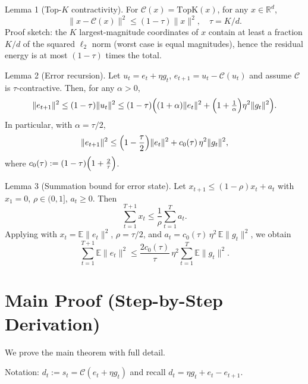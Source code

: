 \documentclass[11pt]{article}
\newcommand{\E}{\mathbb{E}}
\newcommand{\R}{\mathbb{R}}
\begin{document}
\noindent
Lemma 1 (Top-$K$ contractivity).
For $\mathcal{C}(x) = \mathrm{TopK}(x)$, for any $x \in \R^d$,
\[
\|x - \mathcal{C}(x)\|^2 \le (1-\tau)\|x\|^2,\quad \tau = K/d.
\]
Proof sketch: the $K$ largest-magnitude coordinates of $x$ contain at least a fraction $K/d$ of the squared $\ell_2$ norm (worst case is equal magnitudes), hence the residual energy is at most $(1-\tau)$ times the total.

\noindent
Lemma 2 (Error recursion).
Let $u_t = e_t + \eta g_t$, $e_{t+1} = u_t - \mathcal{C}(u_t)$ and assume $\mathcal{C}$ is $\tau$-contractive. Then, for any $\alpha>0$,
\[
\|e_{t+1}\|^2 \le (1-\tau)\|u_t\|^2 \le (1-\tau)\Bigl((1+\alpha)\|e_t\|^2 + \Bigl(1+\tfrac{1}{\alpha}\Bigr)\eta^2\|g_t\|^2\Bigr).
\]
In particular, with $\alpha = \tau/2$,
\[
\|e_{t+1}\|^2 \le \Bigl(1-\frac{\tau}{2}\Bigr)\|e_t\|^2 + c_0(\tau)\,\eta^2 \|g_t\|^2,
\]
where $c_0(\tau) := (1-\tau)\Bigl(1 + \frac{2}{\tau}\Bigr)$.

\noindent
Lemma 3 (Summation bound for error state).
Let $x_{t+1} \le (1-\rho)x_t + a_t$ with $x_1=0$, $\rho \in (0,1]$, $a_t \ge 0$. Then
\[
\sum_{t=1}^{T+1} x_t \le \frac{1}{\rho}\sum_{t=1}^{T} a_t.
\]
Applying with $x_t=\E\|e_t\|^2$, $\rho=\tau/2$, and $a_t = c_0(\tau)\,\eta^2\,\E\|g_t\|^2$, we obtain
\[
\sum_{t=1}^{T+1} \E\|e_t\|^2 \le \frac{2 c_0(\tau)}{\tau}\,\eta^2 \sum_{t=1}^{T} \E\|g_t\|^2.
\]

\section*{Main Proof (Step-by-Step Derivation)}
We prove the main theorem with full detail.

Notation: $d_t := s_t = \mathcal{C}(e_t + \eta g_t)$ and recall $d_t = \eta g_t + e_t - e_{t+1}$.
\end{document}
